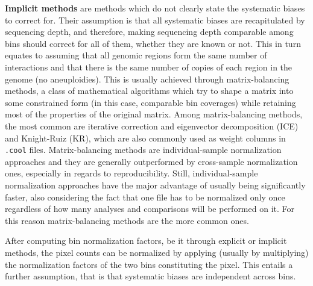 \textbf{Implicit methods} are methods which do not clearly state the systematic biases to correct for. Their assumption is that all systematic biases are recapitulated by sequencing depth, and therefore, making sequencing depth comparable among bins should correct for all of them, whether they are known or not. This in turn equates to assuming that all genomic regions form the same number of interactions and that there is the same number of copies of each region in the genome (no aneuploidies). This is usually achieved through matrix-balancing methods, a class of mathematical algorithms which try to shape a matrix into some constrained form (in this case, comparable bin coverages) while retaining most of the properties of the original matrix. Among matrix-balancing methods, the most common are iterative correction and eigenvector decomposition (ICE)\cite{ice2012} and Knight-Ruiz (KR)\cite{knightruiz2012}, which are also commonly used as weight columns in \texttt{.cool} files. Matrix-balancing methods are individual-sample normalization approaches and they are generally outperformed by cross-sample normalization ones, especially in regards to reproducibility. Still, individual-sample normalization approaches have the major advantage of usually being significantly faster, also considering the fact that one file has to be normalized only once regardless of how many analyses and comparisons will be performed on it. For this reason matrix-balancing methods are the more common ones.

After computing bin normalization factors, be it through explicit or implicit methods, the pixel counts can be normalized by applying (usually by multiplying) the normalization factors of the two bins constituting the pixel. This entails a further assumption, that is that systematic biases are independent across bins.



